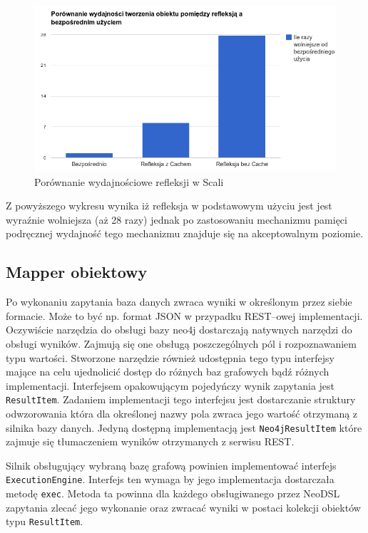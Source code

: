 \documentclass[brudnopis]{xmgr}
\begin{document}
\begin{figure}[H]
	\includegraphics[scale=0.6]{images/reflection-comparison.png}
	\caption{Porównanie wydajnościowe refleksji w Scali}
	\label{fig:reflection_comparison}
\end{figure}

Z powyższego wykresu wynika iż refleksja w podstawowym użyciu jest jest wyraźnie wolniejsza (aż 28 razy) jednak po zastosowaniu mechanizmu pamięci podręcznej wydajność tego mechanizmu znajduje się na akceptowalnym poziomie.

\subsection{Mapper obiektowy}

Po wykonaniu zapytania baza danych zwraca wyniki w określonym przez siebie formacie. Może to być np. format JSON w przypadku REST--owej implementacji. Oczywiście narzędzia do obsługi bazy neo4j dostarczają natywnych narzędzi do obsługi wyników. Zajmują się one obsługą poszczególnych pól i rozpoznawaniem typu wartości. Stworzone narzędzie również udostępnia tego typu interfejsy mające na celu ujednolicić dostęp do różnych baz grafowych bądź różnych implementacji. Interfejsem opakowującym pojedyńczy wynik zapytania jest \texttt{ResultItem}. Zadaniem implementacji tego interfejsu jest dostarczanie struktury odwzorowania która dla określonej nazwy pola zwraca jego wartość otrzymaną z silnika bazy danych. Jedyną dostępną implementacją jest \texttt{Neo4jResultItem} które zajmuje się tłumaczeniem wyników otrzymanych z serwisu REST.

Silnik obsługujący wybraną bazę grafową powinien implementować interfejs \texttt{ExecutionEngine}. Interfejs ten wymaga by jego implementacja dostarczała metodę \texttt{exec}. Metoda ta powinna dla każdego obsługiwanego przez NeoDSL zapytania zlecać jego wykonanie oraz zwracać wyniki w postaci kolekcji obiektów typu \texttt{ResultItem}.
\end{document}
